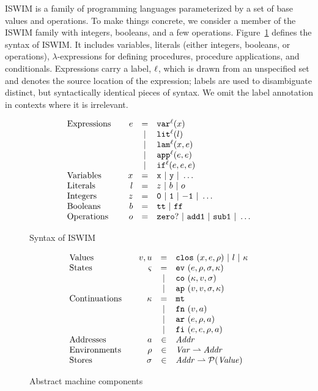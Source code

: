 \documentclass[preprint,onecolumn,9pt]{sigplanconf} %
\begin{document}
ISWIM is a family of programming languages parameterized by a set of
base values and operations.  To make things concrete, we consider a
member of the ISWIM family with integers, booleans, and a few
operations.
%
Figure~\ref{fig:syntax} defines the syntax of ISWIM.  It
includes variables, literals (either integers, booleans, or
operations), $\lambda$-expressions for defining procedures, procedure
applications, and conditionals.  Expressions carry a label, ${\ell}$,
which is drawn from an unspecified set and denotes the source location
of the expression; labels are used to disambiguate distinct, but
syntactically identical pieces of syntax.  We omit the label
annotation in contexts where it is irrelevant.

\begin{figure}
\[
\begin{array}{l@{\qquad}rcl}
\text{Expressions} & \mexp &=& \svar[^\mlab]\mvar\\
&&|& \slit[^\mlab]\mlit\\
&&|& \slam[^\mlab]\mvar\mexp\\
&&|& \sapp[^\mlab]\mexp\mexp \\
&&|& \sif[^\mlab]\mexp\mexp\mexp \\
\text{Variables}&\mvar &=& \syntax{x}\ |\ \syntax{y}\ |\ \dots\\
\text{Literals}&\mlit &=& \mnum\ |\ \mbln\ |\ \mop\\
\text{Integers}&\mnum &=& \syntax{0}\ |\ \syntax{1}\ |\ \syntax{-1}\ |\ \dots\\
\text{Booleans}&\mbln &=& \strue\ |\ \sfalse\\
\text{Operations}&\mop &=& \syntax{zero?}\ |\ \syntax{add1}\ |\ \syntax{sub1}\ |\ \dots
\end{array}
\]
\caption{Syntax of ISWIM}
\label{fig:syntax}
\end{figure}

\begin{figure}
\[
\begin{array}{l@{\qquad}rcl}
\text{Values} & \mval,\mvalx{u} &=& \clos{\mvar,\mexp,\menv}\ |\ \mlit\ |\ \mkont\\
\text{States} & \mstate &=& \ev{\mexp,\menv,\msto,\mkont}\\
                       &&|& \co{\mkont,\mval,\msto}\\
                       &&|& \ap{\mval,\mval,\msto,\mkont}\\
\text{Continuations} & \mkont &=& \kmt\\
&&|& \kfn{\mval,\maddr}\\
&&|& \kar{\mexp,\menv,\maddr}\\
&&|& \kif{\mexp,\mexp,\menv,\maddr}\\
\text{Addresses} &\maddr&\in&\Addr \\
\text{Environments} &\menv&\in& \Var \rightharpoonup \Addr\\
\text{Stores} &\msto&\in& \Addr \rightharpoonup \mathcal{P}(\Value)
\end{array}
\]
\caption{Abstract machine components}
\label{fig:domains}
\end{figure}
\end{document}
